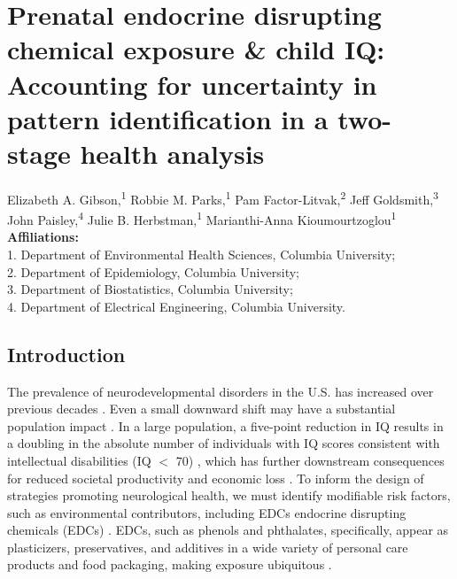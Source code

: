 \chapter[Prenatal endocrine disrupting chemical exposure \& child IQ]{Prenatal endocrine disrupting chemical exposure \& child IQ: {\LARGE Accounting for uncertainty in pattern identification in a two-stage health analysis}}\label{sec:ch4}
\vspace{-3em}

\begin{center}
Elizabeth A. Gibson,\textsuperscript{1} 
Robbie M. Parks,\textsuperscript{1}
Pam Factor-Litvak,\textsuperscript{2} 
Jeff Goldsmith,\textsuperscript{3} 
John Paisley,\textsuperscript{4} 
Julie B. Herbstman,\textsuperscript{1} 
Marianthi-Anna Kioumourtzoglou\textsuperscript{1} \\ 

\textbf{Affiliations:} \\ 1. Department of Environmental Health Sciences, Columbia University; \\ 
2. Department of Epidemiology, Columbia University; \\ 
3. Department of Biostatistics, Columbia University; \\ 
4. Department of Electrical Engineering, Columbia University. 
\end{center}

\clearpage

\section{Introduction}
The prevalence of neurodevelopmental disorders in the U.S. has increased over previous decades \citep{boyle2011trends}. Even a small downward shift may have a substantial population impact \citep{gore2015edc}. In a large population, a five-point reduction in IQ results in a doubling in the absolute number of individuals with IQ scores consistent with intellectual disabilities (IQ $<$ 70) \citep{braun2017early}, which has further downstream consequences for reduced societal productivity and economic loss \citep{bellanger2015neurobehavioral}. To inform the design of strategies promoting neurological health, we must identify modifiable risk factors, such as environmental contributors, including EDCs endocrine disrupting chemicals (EDCs) \citep{sathyanarayana2008phthalates, gore2015edc}. EDCs, such as phenols and phthalates, specifically, appear as plasticizers, preservatives, and additives in a wide variety of personal care products and food packaging, making exposure ubiquitous \citep{philippat2015exposure, schettler2006human, lorber2015exposure, koniecki2011phthalates}. 

